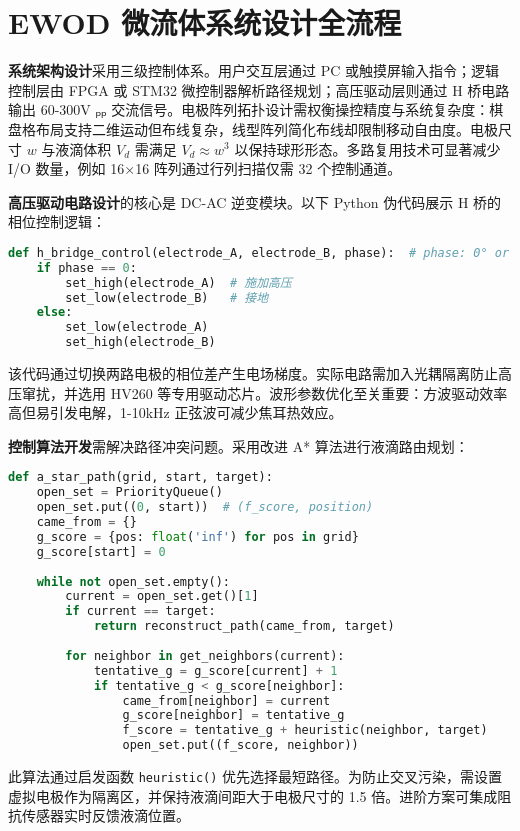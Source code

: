 \chapter{EWOD 微流体系统设计全流程}
\textbf{系统架构设计}采用三级控制体系。用户交互层通过 PC 或触摸屏输入指令；逻辑控制层由 FPGA 或 STM32 微控制器解析路径规划；高压驱动层则通过 H 桥电路输出 60-300V ₚₚ 交流信号。电极阵列拓扑设计需权衡操控精度与系统复杂度：棋盘格布局支持二维运动但布线复杂，线型阵列简化布线却限制移动自由度。电极尺寸 $w$ 与液滴体积 $V_d$ 需满足 $V_d \approx w^3$ 以保持球形形态。多路复用技术可显著减少 I/O 数量，例如 16×16 阵列通过行列扫描仅需 32 个控制通道。\par
\textbf{高压驱动电路设计}的核心是 DC-AC 逆变模块。以下 Python 伪代码展示 H 桥的相位控制逻辑：\par
\begin{lstlisting}[language=python]
def h_bridge_control(electrode_A, electrode_B, phase):  # phase: 0° or 180°
    if phase == 0:
        set_high(electrode_A)  # 施加高压
        set_low(electrode_B)   # 接地
    else:
        set_low(electrode_A)
        set_high(electrode_B)
\end{lstlisting}
该代码通过切换两路电极的相位差产生电场梯度。实际电路需加入光耦隔离防止高压窜扰，并选用 HV260 等专用驱动芯片。波形参数优化至关重要：方波驱动效率高但易引发电解，1-10kHz 正弦波可减少焦耳热效应。\par
\textbf{控制算法开发}需解决路径冲突问题。采用改进 A* 算法进行液滴路由规划：\par
\begin{lstlisting}[language=python]
def a_star_path(grid, start, target):
    open_set = PriorityQueue()
    open_set.put((0, start))  # (f_score, position)
    came_from = {}
    g_score = {pos: float('inf') for pos in grid}
    g_score[start] = 0
    
    while not open_set.empty():
        current = open_set.get()[1]
        if current == target: 
            return reconstruct_path(came_from, target)
        
        for neighbor in get_neighbors(current):
            tentative_g = g_score[current] + 1
            if tentative_g < g_score[neighbor]:
                came_from[neighbor] = current
                g_score[neighbor] = tentative_g
                f_score = tentative_g + heuristic(neighbor, target)
                open_set.put((f_score, neighbor))
\end{lstlisting}
此算法通过启发函数 \texttt{heuristic()} 优先选择最短路径。为防止交叉污染，需设置虚拟电极作为隔离区，并保持液滴间距大于电极尺寸的 1.5 倍。进阶方案可集成阻抗传感器实时反馈液滴位置。\par
